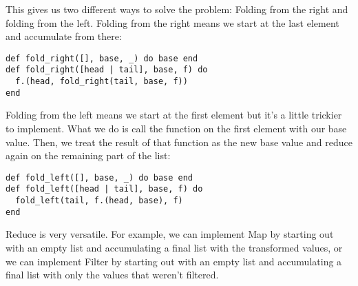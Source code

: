 \documentclass[a4paper,11pt]{article}
\begin{document}
This gives us two different ways to solve the problem: Folding from the right and folding from the left. Folding from the right means we start at the last element and accumulate from there:

\begin{verbatim}
def fold_right([], base, _) do base end
def fold_right([head | tail], base, f) do
  f.(head, fold_right(tail, base, f))
end
\end{verbatim}

Folding from the left means we start at the first element but it's a little trickier to implement.
What we do is call the function on the first element with our base value.
Then, we treat the result of that function as the new base value and reduce again on the remaining part of the list:

\begin{verbatim}
def fold_left([], base, _) do base end
def fold_left([head | tail], base, f) do
  fold_left(tail, f.(head, base), f)
end
\end{verbatim}

Reduce is very versatile. For example, we can implement Map by starting out with an empty list and accumulating a final list with the transformed values,
or we can implement Filter by starting out with an empty list and accumulating a final list with only the values that weren't filtered.
\end{document}
